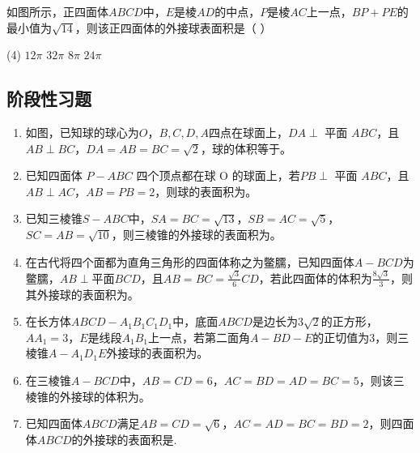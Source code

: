 \begin{example}
    如图所示，正四面体$ABCD$中，$E$是棱$AD$的中点，$P$是棱$AC$上一点，$BP + PE$的最小值为$\sqrt{14}$，则该正四面体的外接球表面积是（\hspace{1.5cm} ）
    \begin{tasks}(4)
        \task $12\pi$
        \task $32\pi$
        \task $8\pi$
        \task $24\pi$
    \end{tasks}
\end{example}

\newpage{}

\subsection{阶段性习题}

\begin{enumerate}
    \item 如图，已知球的球心为$O$，$B, C, D, A$四点在球面上，$DA \perp$ 平面 $ABC$，且 $AB \perp BC$，$DA = AB = BC = \sqrt{2}$，球的体积等于\underline{\hspace{2cm}}。

    \item 已知四面体 $P - ABC$ 四个顶点都在球 O 的球面上，若$PB \perp$ 平面  $ABC$，且$AB \perp AC$，$AB = PB = 2$，则球的表面积为\underline{\hspace{2cm}}。

    \item 已知三棱锥$S - ABC$中，$SA = BC = \sqrt{13}$，$SB = AC = \sqrt{5}$，$SC = AB = \sqrt{10}$，则三棱锥的外接球的表面积为\underline{\hspace{2cm}}。

    \item 在古代将四个面都为直角三角形的四面体称之为鳖臑，已知四面体$A - BCD$为鳖臑，$AB \perp \text{平面}BCD$，且$AB = BC = \frac{\sqrt{3}}{6}CD$，若此四面体的体积为$\frac{8\sqrt{3}}{3}$，则其外接球的表面积为\underline{\hspace{2cm}}。

    \item 在长方体$ABCD - A_1B_1C_1D_1$中，底面$ABCD$是边长为$3\sqrt{2}$的正方形，$AA_1 = 3$，$E$是线段$A_1B_1$上一点，若第二面角$A - BD - E$的正切值为3，则三棱锥$A - A_1D_1E$外接球的表面积为\underline{\hspace{2cm}}。

    \item 在三棱锥$A - BCD$中，$AB = CD = 6$，$AC = BD = AD = BC = 5$，则该三棱锥的外接球的体积为\underline{\hspace{2cm}}。

    \item 已知四面体$ABCD$满足$AB = CD = \sqrt{6}$，$AC = AD = BC = BD = 2$，则四面体$ABCD$的外接球的表面积是\underline{\hspace{2cm}}.

\end{enumerate}

